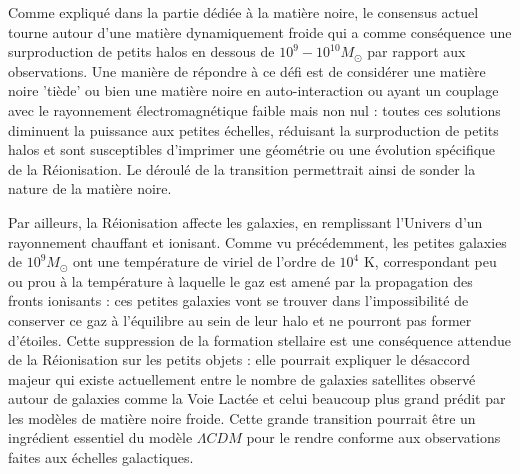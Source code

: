 Comme expliqué dans la partie dédiée à la matière noire, le consensus actuel tourne autour d'une matière dynamiquement froide qui a comme conséquence une surproduction de petits halos en dessous de $10^9-10^{10} M_\odot$ par rapport aux observations. Une manière de répondre à ce défi est de considérer une matière noire 'tiède' ou bien une matière noire en auto-interaction ou ayant un couplage avec le rayonnement électromagnétique faible mais non nul : toutes ces solutions diminuent la puissance aux petites échelles, réduisant la surproduction de petits halos et sont susceptibles d'imprimer une géométrie ou une évolution spécifique de la Réionisation. Le déroulé de la transition permettrait ainsi de sonder la nature de la matière noire.

Par ailleurs, la Réionisation affecte les galaxies, en remplissant l'Univers d'un rayonnement chauffant et ionisant. Comme vu précédemment, les petites galaxies de $10^9 M_\odot$ ont une température de viriel de l'ordre de $10^4$ K, correspondant peu ou prou à la température à laquelle le gaz est amené par la propagation des fronts ionisants : ces petites galaxies vont se trouver dans l'impossibilité de conserver ce gaz à l'équilibre au sein de leur halo et ne pourront pas former d'étoiles. Cette suppression de la formation stellaire est une conséquence attendue de la Réionisation sur les petits objets : elle pourrait expliquer le désaccord majeur qui existe actuellement entre le nombre de galaxies satellites observé autour de galaxies comme la Voie Lactée et celui beaucoup plus grand prédit par les modèles de matière noire froide. Cette grande transition pourrait être un ingrédient essentiel du modèle $\Lambda CDM$ pour le rendre conforme aux observations faites aux échelles galactiques.

